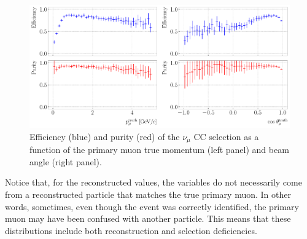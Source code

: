 \begin{figure}[t]
	\centering
	\includegraphics[width=.99\linewidth]{Images/GAr_selection/numuCC_selection_true_kinematics_performance.pdf}
	\caption[Efficiency and purity of the $\nu_{\mu}$ CC selection as a function of the primary muon true momentum and beam angle.]{Efficiency (blue) and purity (red) of the $\nu_{\mu}$ CC selection as a function of the primary muon true momentum (left panel) and beam angle (right panel).}
	\label{fig:numuCC_muon_kinematics}
\end{figure}

Notice that, for the reconstructed values, the variables do not necessarily come from a reconstructed particle that matches the true primary muon. In other words, sometimes, even though the event was correctly identified, the primary muon may have been confused with another particle. This means that these distributions include both reconstruction and selection deficiencies.

